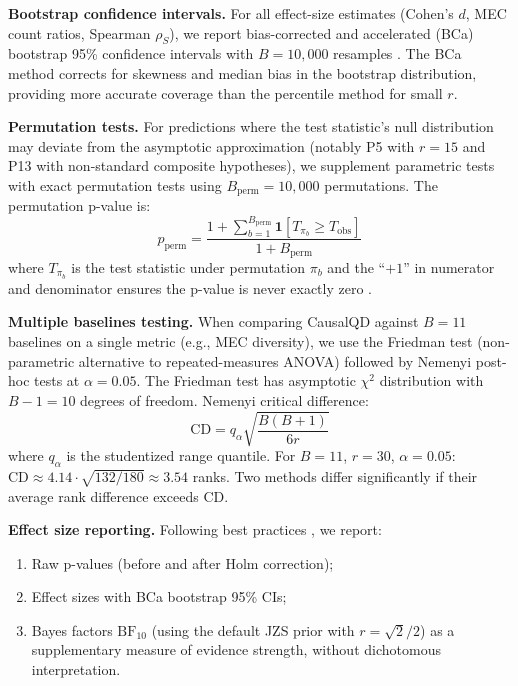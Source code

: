 \documentclass{article}
\theoremstyle{definition}
\theoremstyle{plain}
\theoremstyle{remark}
\begin{document}
\textbf{Bootstrap confidence intervals.} For all effect-size estimates
(Cohen's $d$, MEC count ratios, Spearman $\rho_S$), we report
bias-corrected and accelerated (BCa) bootstrap 95\% confidence intervals
with $B = 10{,}000$ resamples \citep{efron1994introduction}. The BCa
method corrects for skewness and median bias in the bootstrap
distribution, providing more accurate coverage than the percentile method
for small $r$.

\textbf{Permutation tests.} For predictions where the test statistic's
null distribution may deviate from the asymptotic approximation (notably
P5 with $r = 15$ and P13 with non-standard composite hypotheses), we
supplement parametric tests with exact permutation tests using
$B_{\mathrm{perm}} = 10{,}000$ permutations. The permutation p-value is:
\begin{equation}
  p_{\mathrm{perm}} = \frac{1 + \sum_{b=1}^{B_{\mathrm{perm}}}
    \mathbf{1}[T_{\pi_b} \geq T_{\mathrm{obs}}]}{1 + B_{\mathrm{perm}}}
\end{equation}
where $T_{\pi_b}$ is the test statistic under permutation $\pi_b$ and the
``$+1$'' in numerator and denominator ensures the p-value is never exactly
zero \citep{phipson2010permutation}.

\textbf{Multiple baselines testing.} When comparing CausalQD against
$B = 11$ baselines on a single metric (e.g., MEC diversity), we use the
Friedman test (non-parametric alternative to repeated-measures ANOVA)
followed by Nemenyi post-hoc tests at $\alpha = 0.05$. The Friedman test
has asymptotic $\chi^2$ distribution with $B - 1 = 10$ degrees of freedom.
Nemenyi critical difference:
\begin{equation}
  \mathrm{CD} = q_\alpha \sqrt{\frac{B(B+1)}{6r}}
\end{equation}
where $q_\alpha$ is the studentized range quantile. For $B = 11$,
$r = 30$, $\alpha = 0.05$: $\mathrm{CD} \approx 4.14 \cdot
\sqrt{132/180} \approx 3.54$ ranks. Two methods differ significantly if
their average rank difference exceeds $\mathrm{CD}$.

\textbf{Effect size reporting.} Following best practices
\citep{wasserstein2019moving}, we report:
\begin{enumerate}
  \item Raw p-values (before and after Holm correction);
  \item Effect sizes with BCa bootstrap 95\% CIs;
  \item Bayes factors $\mathrm{BF}_{10}$ (using the default JZS prior
    with $r = \sqrt{2}/2$) as a supplementary measure of evidence
    strength, without dichotomous interpretation.
\end{enumerate}
\end{document}
